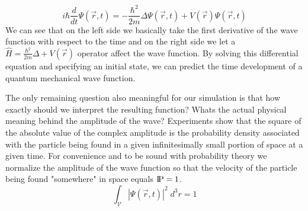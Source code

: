 \begin{equation}
	\label{eq::schrodinger_general}
	i \hbar \frac{d}{dt}\Psi(\vec{r}, t) = - \frac{\hbar^2}{2m}\Delta\Psi(\vec{r}, t) + V(\vec{r})\Psi(\vec{r}, t)
\end{equation}
We can see that on the left side we basically take the first derivative of the wave function with respect to the time and on the right side we let a $\hat{H} = \frac{\hbar^2}{2m}\Delta + V(\vec{r})$ operator affect the wave function.
By solving this differential equation and specifying an initial state, we can predict the time development of a quantum mechanical wave function.

The only remaining question also meaningful for our simulation is that how exactly should we interpret the resulting function?
Whats the actual physical meaning behind the amplitude of the wave?
Experiments show that the square of the absolute value of the complex amplitude is the probability density associated with the particle being found in a given infinitesimally small portion of space at a given time.
For convenience and to be sound with probability theory we normalize the amplitude of the wave function so that the velocity of the particle being found "somewhere" in space equals $\text{I\kern-0.15em P} = 1$.
\begin{equation}
	\label{eq:normalization}
	\int_\mathcal{V} |\Psi(\vec{r}, t)|^2 \;d^3r = 1
\end{equation}


